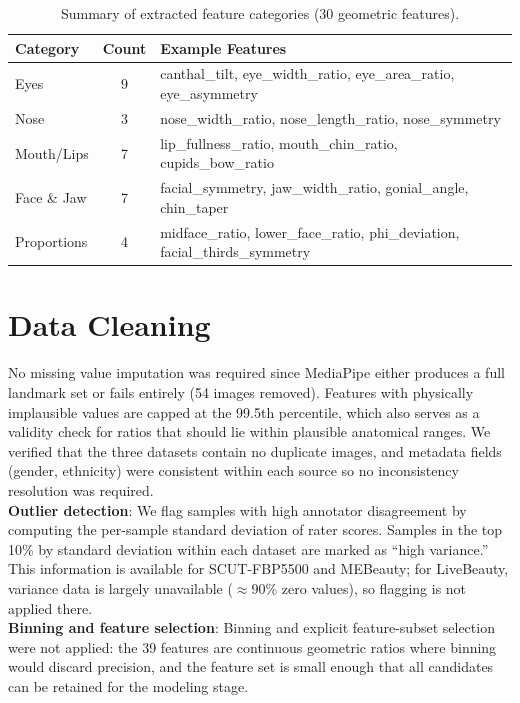 \documentclass[a4paper,oneside,bibliography=totoc]{scrbook}
\begin{document}
\begin{table}[h]
\centering
\caption{Summary of extracted feature categories (30 geometric features).}
\label{tab:features}
\small
\begin{tabular}{lc>{\raggedright\arraybackslash}p{7.5cm}}
\toprule
\textbf{Category} & \textbf{Count} & \textbf{Example Features} \\
\midrule
Eyes & 9 & canthal\_tilt, eye\_width\_ratio, eye\_area\_ratio, eye\_asymmetry \\
Nose & 3 & nose\_width\_ratio, nose\_length\_ratio, nose\_symmetry \\
Mouth/Lips & 7 & lip\_fullness\_ratio, mouth\_chin\_ratio, cupids\_bow\_ratio \\
Face \& Jaw & 7 & facial\_symmetry, jaw\_width\_ratio, gonial\_angle, chin\_taper \\
Proportions & 4 & midface\_ratio, lower\_face\_ratio, phi\_deviation, facial\_thirds\_symmetry \\
\bottomrule
\end{tabular}
\end{table}

\section{Data Cleaning}

No missing value imputation was required since MediaPipe either produces a full landmark set or fails entirely (54 images removed). Features with physically implausible values are capped at the 99.5th percentile, which also serves as a validity check for ratios that should lie within plausible anatomical ranges. We verified that the three datasets contain no duplicate images, and metadata fields (gender, ethnicity) were consistent within each source so no inconsistency resolution was required.\\
\textbf{Outlier detection}: We flag samples with high annotator disagreement by computing the per-sample standard deviation of rater scores. Samples in the top 10\% by standard deviation within each dataset are marked as ``high variance.'' This information is available for SCUT-FBP5500 and MEBeauty; for LiveBeauty, variance data is largely unavailable ($\approx$90\% zero values), so flagging is not applied there.\\
\textbf{Binning and feature selection}: Binning and explicit feature-subset selection were not applied: the 39 features are continuous geometric ratios where binning would discard precision, and the feature set is small enough that all candidates can be retained for the modeling stage.\\
\end{document}
